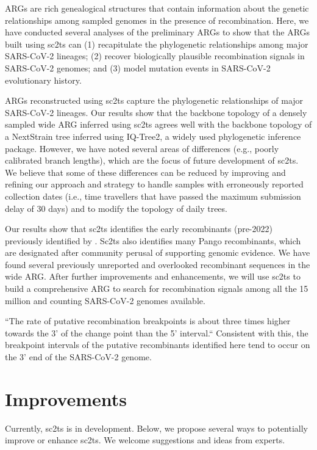 \documentclass{article}
\begin{document}
ARGs are rich genealogical structures that contain information about the
genetic relationships among sampled genomes in the presence of recombination.
Here, we have conducted several analyses of the preliminary ARGs to show that
the ARGs built using sc2ts can (1) recapitulate the phylogenetic relationships
among major SARS-CoV-2 lineages; (2) recover biologically plausible
recombination signals in SARS-CoV-2 genomes; and (3) model mutation events in
SARS-CoV-2 evolutionary history.

ARGs reconstructed using sc2ts capture the phylogenetic relationships of major
SARS-CoV-2 lineages. Our results show that the backbone topology of a densely
sampled wide ARG inferred using sc2ts agrees well with the backbone topology of
a NextStrain tree inferred using IQ-Tree2, a widely used phylogenetic inference
package. However, we have noted several areas of differences (e.g., poorly
calibrated branch lengths), which are the focus of future development of sc2ts.
We believe that some of these differences can be reduced by improving and
refining our approach and strategy to handle samples with erroneously reported
collection dates (i.e., time travellers that have passed the maximum submission
delay of 30 days) and to modify the topology of daily trees.

Our results show that sc2ts identifies the early recombinants (pre-2022)
previously identified by \cite{Jackson2021-ik}. Sc2ts also identifies many
Pango recombinants, which are designated after community perusal of supporting
genomic evidence. We have found several previously unreported and overlooked
recombinant sequences in the wide ARG. After further improvements and
enhancements, we will use sc2ts to build a comprehensive ARG to search for
recombination signals among all the 15 million and counting SARS-CoV-2 genomes
available.

``The rate of putative recombination breakpoints is about three times higher
towards the 3' of the change point than the 5' interval.`` Consistent with this,
the breakpoint intervals of the putative recombinants identified here tend to
occur on the 3’ end of the SARS-CoV-2 genome.

\section{Improvements}

Currently, sc2ts is in development. Below, we propose several ways to
potentially improve or enhance sc2ts. We welcome suggestions and ideas from
experts.
\end{document}
